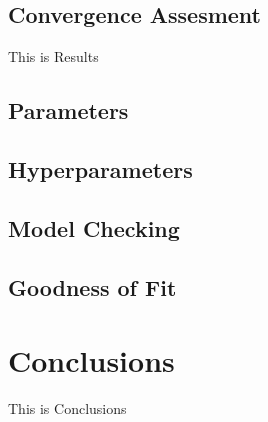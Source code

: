 \documentclass[
]{book}
\begin{document}
\hypertarget{convergence-assesment}{%
\section{Convergence Assesment}\label{convergence-assesment}}

This is Results

\hypertarget{parameters}{%
\section{Parameters}\label{parameters}}

\hypertarget{hyperparameters}{%
\section{Hyperparameters}\label{hyperparameters}}

\hypertarget{model-checking}{%
\section{Model Checking}\label{model-checking}}

\hypertarget{goodness-of-fit}{%
\section{Goodness of Fit}\label{goodness-of-fit}}

\hypertarget{conclusions}{%
\chapter{Conclusions}\label{conclusions}}

This is Conclusions

\newpage

  
\end{document}
